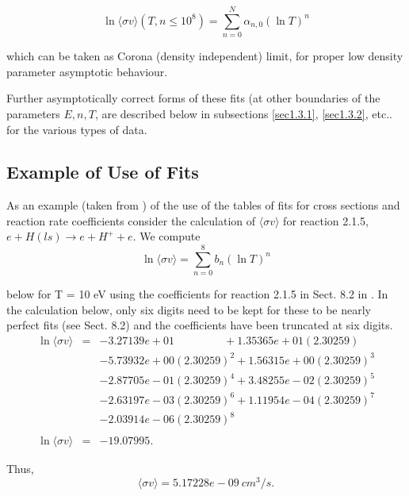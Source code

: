 \documentclass[12pt,dvipdfmx]{article}
\begin{document}
$$\ln \langle\sigma v\rangle(T, n\leq 10^8) = \sum_{n=0}^N \alpha_{n,0}(\ln T)^n$$

which can be taken as Corona (density independent) limit, for proper low density parameter asymptotic behaviour.

Further asymptotically correct forms of these fits (at other boundaries of the parameters $E, n, T$, are described below
in subsections \ref{sec1.3.1}, \ref{sec1.3.2}, etc.. for the various types of data.

\subsection{Example of Use of Fits}\label{sec1.1}

As an example (taken from \cite{kn:Janev}) of the use of the tables of fits for cross sections and reaction rate coefficients consider
the calculation of $\langle\sigma v\rangle$ for reaction 2.1.5, $e + H(ls) \rightarrow e + H^+ + e$. We compute\\

      $$\ln \langle\sigma v\rangle = \sum_{n=0}^8 b_n(\ln T)^n$$

below for T = 10 eV using the coefficients for reaction 2.1.5 in Sect. 8.2 in \cite{kn:Janev}. In the calculation below, only
six digits need to be kept for these to be nearly perfect fits (see Sect. 8.2) and the coefficients have
been truncated at six digits.\\

\begin{eqnarray*}
\ln \langle\sigma v\rangle & = & -3.27139e+01 \quad\quad\quad\quad \ \ + 1.35365e+01 (2.30259)\\
& & -5.73932e+00 (2.30259)^2 + 1.56315e+00 (2.30259)^3\\
& & -2.87705e-01 (2.30259)^4 + 3.48255e-02 (2.30259)^5\\
& & -2.63197e-03 (2.30259)^6 + 1.11954e-04 (2.30259)^7\\
& & -2.03914e-06 (2.30259)^8\\
\\
\ln \langle\sigma v\rangle & = & -19.07995.
\end{eqnarray*}


Thus,\\

$$\langle\sigma v\rangle = 5.17228e-09  \ cm^3/s.$$
\end{document}
